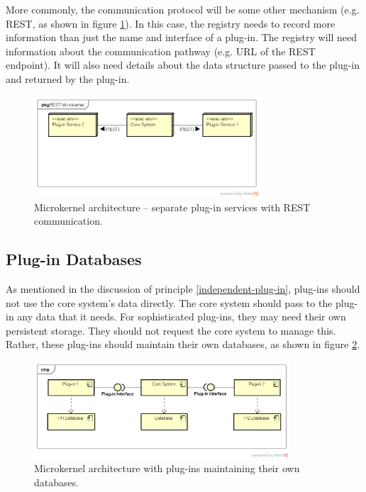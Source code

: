 More commonly, the communication protocol will be some other mechanism (e.g. REST, as shown in figure \ref{fig:rest-microkernel}).
In this case, the registry needs to record more information than just the name and interface of a plug-in.
The registry will need information about the communication pathway (e.g. URL of the REST endpoint).
It will also need details about the data structure passed to the plug-in and returned by the plug-in.

\begin{figure}[h!]
    \centering
    \includegraphics[trim=38 167 19 45,clip,width=0.75\textwidth]{diagrams/rest-microkernel.png}
    \caption{Microkernel architecture -- separate plug-in services with REST communication.}
    \label{fig:rest-microkernel}
\end{figure}

\subsection{Plug-in Databases}

As mentioned in the discussion of principle \ref{independent-plug-in}, plug-ins should not use the core system's data directly.
The core system should pass to the plug-in any data that it needs.
For sophisticated plug-ins, they may need their own persistent storage.
They should not request the core system to manage this.
Rather, these plug-ins should maintain their own databases, as shown in figure \ref{fig:plug-in-dbs}.

\begin{figure}[h!]
    \centering
    \includegraphics[trim=38 81 24 50,clip,width=0.85\textwidth]{diagrams/plug-in-databases.png}
    \caption{Microkernel architecture with plug-ins maintaining their own databases.}
    \label{fig:plug-in-dbs}
\end{figure}

